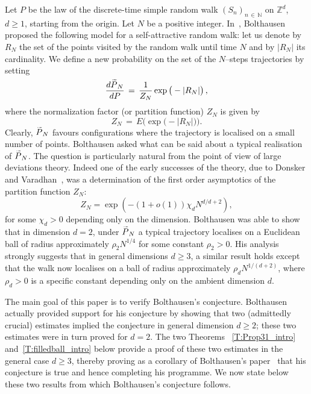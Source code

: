 \documentclass[10pt]{amsart}
\theoremstyle{definition}\newtheorem{defi}[theo]{Definition}\newtheorem{rema}[theo]{Remark}\newtheorem{exam}[theo]{Example}\newtheorem{exem}[theo]{Example}\newtheorem{nota}[theo]{Notation}
\newcommand*\N {{\mathbb N}}
\newcommand*\wP{\smash{\widetilde P}}
\renewcommand{\N}{\mathbb{N}}
\begin{document}
Let $P$ be the law of the discrete-time simple random walk $(S_n)_{n\,\in\,\N}$ on $\mathbb{Z}^d$, $d\geq 1$, starting from the origin. Let $N$ be a positive integer. In~\cite{BO}, Bolthausen proposed the following model for a self-attractive random walk: let us denote by $R_N$ the set of the points visited by the random walk until time $N$ and by $|R_N|$ its cardinality. We define a new probability on the set of the $N$--steps trajectories by setting
\begin{equation}\label{defPN}
\frac{d\wP_N}{dP}\,=\,\frac{1}{Z_N}\exp\big(-|R_N|\big)\,,
\end{equation}
where the normalization factor (or partition function) $Z_N$ is given by
\begin{equation}\label{partitionfunction}
Z_N\,=\,E\big(
\exp\big(-|R_N|\big)\big).
\end{equation}
Clearly, $\wP_N$ favours configurations where the trajectory is localised on a small number of points. Bolthausen asked what can be said about a typical realisation of $\wP_N$. The question is particularly natural from the point of view of large deviations theory. Indeed one of the early successes of the theory, due to Donsker and Varadhan~\cite{DV1}, was a determination of the first order asymptotics of the partition function $Z_N$:
\begin{equation}\label{DV}
Z_N = \exp \left(- (1+ o(1)) \chi_d N^{d/{d+2}}
\right),
\end{equation}
for some $\chi_d>0$ depending only on the dimension. Bolthausen was able to show that in dimension $d=2$, under $\wP_N$ a typical trajectory localises on a Euclidean ball of radius approximately $\rho_2 N^{1/4}$ for some constant $\rho_2>0$. His analysis strongly suggests that in general dimensions $d \ge 3$, a similar result holds except that the walk now localises on a ball of radius approximately $\rho_d N^{1/ (d+2)}$, where $\rho_d>0$ is a specific constant depending only on the ambient dimension $d$.

The main goal of this paper is to verify Bolthausen's conjecture. Bolthausen actually provided support for his conjecture by showing that two (admittedly crucial) estimates implied the conjecture in general dimension $d \ge 2$; these two estimates were in turn proved for $d = 2$. The two Theorems ~\ref{T:Prop31_intro} and~\ref{T:filledball_intro} below provide a proof of these two estimates in the general case $d \ge 3$, thereby proving as a corollary of Bolthausen's paper~\cite{BO} that his conjecture is true and hence completing his programme. We now state below these two results from which Bolthausen's conjecture follows.
\end{document}
